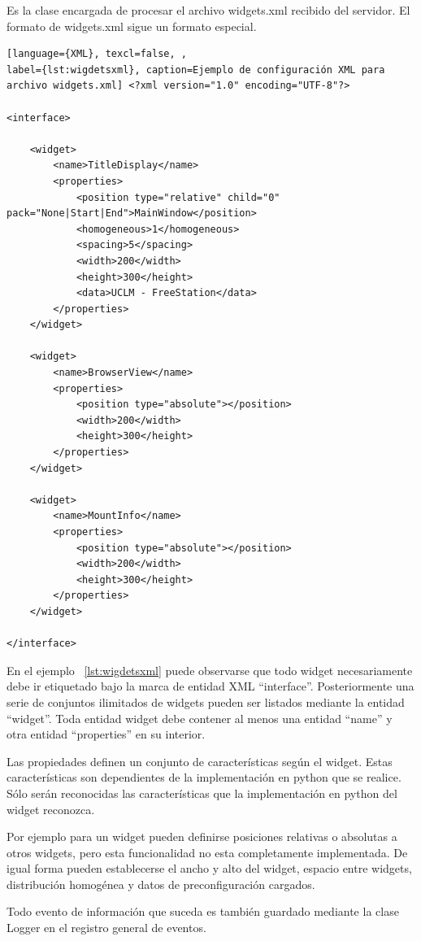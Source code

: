 Es la clase encargada de procesar el archivo widgets.xml recibido del servidor.
El formato de widgets.xml sigue un formato especial.
\begin{lstlisting}[language={XML}, texcl=false, ,
label={lst:wigdetsxml}, caption=Ejemplo de configuración XML para
archivo widgets.xml] <?xml version="1.0" encoding="UTF-8"?>

<interface>

    <widget>
        <name>TitleDisplay</name>
        <properties>
            <position type="relative" child="0" pack="None|Start|End">MainWindow</position>
            <homogeneous>1</homogeneous>
            <spacing>5</spacing>
            <width>200</width>
            <height>300</height>
            <data>UCLM - FreeStation</data>
        </properties>
    </widget>
    
    <widget>
        <name>BrowserView</name>
        <properties>
            <position type="absolute"></position>
            <width>200</width>
            <height>300</height>
        </properties>
    </widget>
    
    <widget>
        <name>MountInfo</name>
        <properties>
            <position type="absolute"></position>
            <width>200</width>
            <height>300</height>
        </properties>
    </widget>
    
</interface>
\end{lstlisting}

\newpage

En el ejemplo ~\ref{lst:wigdetsxml} puede observarse que todo widget
necesariamente debe ir etiquetado bajo la marca de entidad XML ``interface''.
Posteriormente una serie de conjuntos ilimitados de widgets pueden ser listados
mediante la entidad ``widget''. Toda entidad widget debe contener al menos una
entidad ``name'' y otra entidad ``properties'' en su interior.

Las propiedades definen un conjunto de características según el widget. Estas
características son dependientes de la implementación en python que se realice.
Sólo serán reconocidas las características que la implementación en python del
widget reconozca.

Por ejemplo para un widget pueden definirse posiciones relativas o absolutas a
otros widgets, pero esta funcionalidad no esta completamente implementada.
De igual forma pueden establecerse el ancho y alto del widget, espacio entre
widgets, distribución homogénea y datos de preconfiguración cargados.

Todo evento de información que suceda es también guardado mediante la clase
Logger en el registro general de eventos.

